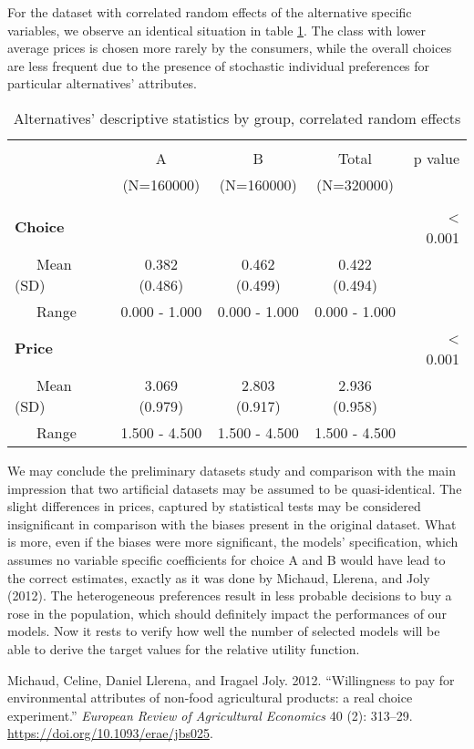 \documentclass[11pt,]{article}
\begin{document}
For the dataset with correlated random effects of the alternative
specific variables, we observe an identical situation in table
\ref{tab:alt3}. The class with lower average prices is chosen more
rarely by the consumers, while the overall choices are less frequent due
to the presence of stochastic individual preferences for particular
alternatives' attributes.

\begin{table}[!htbp] \centering 
  \caption{Alternatives' descriptive statistics by group, correlated random effects} 
  \label{tab:alt3} 
\begin{tabular}{@{\extracolsep{5pt}}lcccr}
\\[-1.8ex]\hline 
\hline \\[-1.8ex] 
 & A  & B  & Total  & p value\\
 & (N=160000) & (N=160000) & (N=320000) &  \\
\hline \\[-1.8ex] 
\textbf{Choice} &  &  &  & < 0.001\\
~~~Mean (SD) & 0.382 (0.486) & 0.462 (0.499) & 0.422 (0.494) & \\
~~~Range & 0.000 - 1.000 & 0.000 - 1.000 & 0.000 - 1.000 & \\
\textbf{Price} &  &  &  & < 0.001\\
~~~Mean (SD) & 3.069 (0.979) & 2.803 (0.917) & 2.936 (0.958) & \\
~~~Range & 1.500 - 4.500 & 1.500 - 4.500 & 1.500 - 4.500 & \\
\hline
\end{tabular}
\end{table}

We may conclude the preliminary datasets study and comparison with the
main impression that two artificial datasets may be assumed to be
quasi-identical. The slight differences in prices, captured by
statistical tests may be considered insignificant in comparison with the
biases present in the original dataset. What is more, even if the biases
were more significant, the models' specification, which assumes no
variable specific coefficients for choice A and B would have lead to the
correct estimates, exactly as it was done by Michaud, Llerena, and Joly
(2012). The heterogeneous preferences result in less probable decisions
to buy a rose in the population, which should definitely impact the
performances of our models. Now it rests to verify how well the number
of selected models will be able to derive the target values for the
relative utility function.

\FloatBarrier

\hypertarget{refs}{}
\leavevmode\hypertarget{ref-llerena2013rose}{}%
Michaud, Celine, Daniel Llerena, and Iragael Joly. 2012. ``Willingness
to pay for environmental attributes of non-food agricultural products: a
real choice experiment.'' \emph{European Review of Agricultural
Economics} 40 (2): 313--29. \url{https://doi.org/10.1093/erae/jbs025}.
\end{document}
